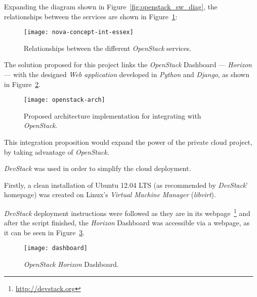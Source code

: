 Expanding the diagram shown in Figure~\ref{fig:openstack_sw_diag}, the relationships between the services are shown in Figure~\ref{fig:openstack_services}:

\begin{figure}[h!]
  \begin{center}
    \leavevmode
    \texttt{[image: nova-concept-int-essex]}
    \caption{Relationships between the different \textit{OpenStack} services.~\cite{ken-pepple:essex-arch}}
    \label{fig:openstack_services}
  \end{center}
\end{figure}

The solution proposed for this project links the \textit{OpenStack} Dashboard --- \textit{Horizon} --- with the designed \textit{Web application} developed in \textit{Python} and \textit{Django}, as shown in Figure~\ref{fig:architecture}.

\begin{figure}[t]
  \begin{center}
    \leavevmode
    \texttt{[image: openstack-arch]}
    \caption{Proposed architecture implementation for integrating with \textit{OpenStack}.}
    \label{fig:architecture}
  \end{center}
\end{figure}


This integration proposition would expand the power of the private cloud project, by taking advantage of \textit{OpenStack}.

\textit{DevStack} was used in order to simplify the cloud deployment.

Firstly, a clean installation of Ubuntu 12.04 LTS (as recommended by \textit{DevStack}' homepage) was created on Linux's \textit{Virtual Machine Manager} (\textit{libvirt}).

\textit{DevStack} deployment instructions were followed as they are in its webpage~\footnote{\url{http://devstack.org}} and after the script finished, the \textit{Horizon} Dashboard was accessible via a webpage, as it can be seen in Figure~\ref{fig:stack-dashboard}.

\begin{figure}[t]
  \begin{center}
    \leavevmode
    \texttt{[image: dashboard]}
    \caption{\textit{OpenStack Horizon} Dashboard.}
    \label{fig:stack-dashboard}
  \end{center}
\end{figure}

